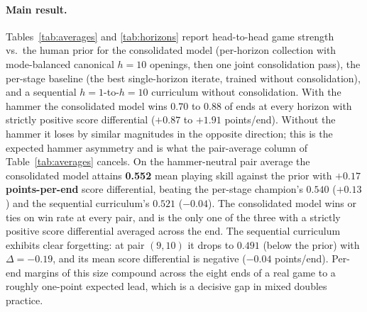\documentclass[11pt]{article}
\begin{document}
\paragraph{Main result.}
Tables~\ref{tab:averages} and \ref{tab:horizons} report head-to-head game
strength vs.\ the human prior for the consolidated model (per-horizon
collection with mode-balanced canonical $h{=}10$ openings, then one joint
consolidation pass), the per-stage baseline (the best single-horizon
iterate, trained without consolidation), and a sequential
$h{=}1$-to-$h{=}10$ curriculum without consolidation. With the hammer the
consolidated model wins $0.70$ to $0.88$ of ends at every horizon with
strictly positive score differential ($+0.87$ to $+1.91$ points/end).
Without the hammer it loses by similar magnitudes in the opposite
direction; this is the expected hammer asymmetry and is what the
pair-average column of Table~\ref{tab:averages} cancels. On the
hammer-neutral pair average the consolidated model attains
\textbf{0.552} mean playing skill against the prior with \textbf{$+0.17$
points-per-end} score differential, beating the per-stage champion's
$0.540$ ($+0.13$) and the sequential curriculum's $0.521$ ($-0.04$). The
consolidated model wins or ties on win rate at every pair, and is the
only one of the three with a strictly positive score differential
averaged across the end. The sequential curriculum exhibits clear
forgetting: at pair $(9, 10)$ it drops to $0.491$ (below the prior) with
$\Delta=-0.19$, and its mean score differential is negative ($-0.04$
points/end). Per-end margins of this size compound across the eight ends
of a real game to a roughly one-point expected lead, which is a decisive
gap in mixed doubles practice.
\end{document}
